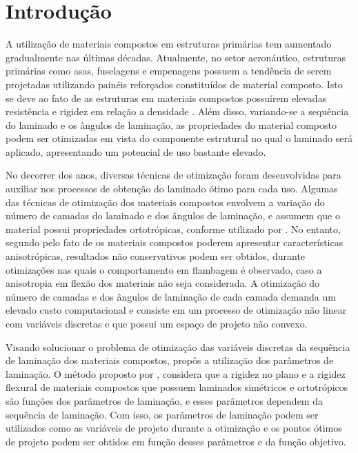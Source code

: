 \chapter[Introdução]{Introdução}

A utilização de materiais compostos em estruturas primárias tem aumentado gradualmente nas últimas décadas. Atualmente, no setor aeronáutico, estruturas primárias como asas, fuselagens e empenagens possuem a tendência de serem projetadas utilizando painéis reforçados constituídos de material composto. Isto se deve ao fato de as estruturas em materiais compostos possuírem elevadas resistência e rigidez em relação a densidade \cite{herencia2007optimization}. Além disso, variando-se a sequência do laminado e os ângulos de laminação, as propriedades do material composto podem ser otimizadas em vista do componente estrutural no qual o laminado será aplicado, apresentando um potencial de uso bastante elevado.

No decorrer dos anos, diversas técnicas de otimização foram desenvolvidas para auxiliar nos processos de obtenção do laminado ótimo para cada uso. Algumas das técnicas de otimização dos materiais compostos envolvem a variação do número de camadas do laminado e dos ângulos de laminação, e assumem que o material possui propriedades ortotrópicas, conforme utilizado por \cite{schmit1973optimum}. No entanto, segundo \cite{chamis1969buckling} pelo fato de os materiais compostos poderem apresentar características anisotrópicas, resultados não conservativos podem ser obtidos, durante otimizações nas quais o comportamento em flambagem é observado, caso a anisotropia em flexão dos materiais não seja considerada. A otimização do número de camadas e dos ângulos de laminação de cada camada demanda um elevado custo computacional e consiste em um processo de otimização não linear com variáveis discretas e que possui um espaço de projeto não convexo.

Visando solucionar o problema de otimização das variáveis discretas da sequência de laminação dos materiais compostos, \cite{miki1991optimum} propôs a utilização dos parâmetros de laminação. O método proposto por \cite{miki1991optimum}, considera que a rigidez no plano e a rigidez flexural de materiais compostos que possuem laminados simétricos e ortotrópicos são funções dos parâmetros de laminação, e esses parâmetros dependem da sequência de laminação. Com isso, os parâmetros de laminação podem ser utilizados como as variáveis de projeto durante a otimização e os pontos ótimos de projeto podem ser obtidos em função desses parâmetros e da função objetivo.


